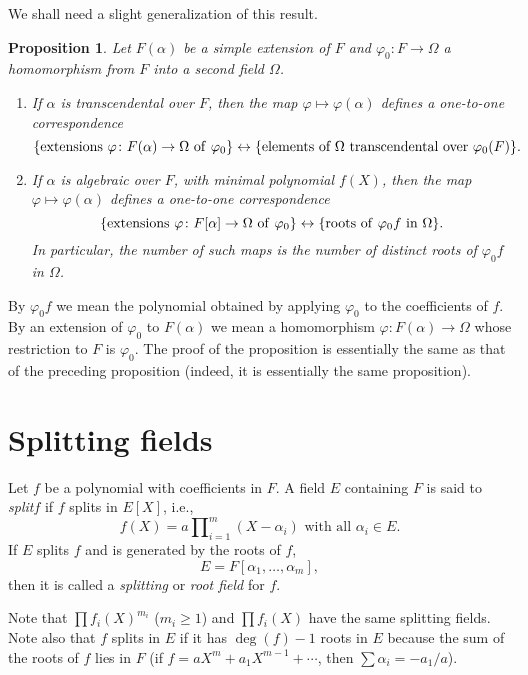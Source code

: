 \documentclass[a4paper,11pt,final,openany]{memoir}
\newtheorem{proposition}[X]{Proposition}
\theoremstyle{nonumberplain}
\begin{document}
We shall need a slight generalization of this result.

\begin{proposition}
\label{sf2} Let $F(\alpha)$ be a simple extension of $F$ and $\varphi
_{0}\colon F\rightarrow\Omega$ a homomorphism from $F$ into a second field
$\Omega$.

\begin{enumerate}
\item If $\alpha$ is transcendental over $F$, then the map $\varphi
\mapsto\varphi(\alpha)$ defines a one-to-one correspondence
\[
\{\text{extensions }\varphi\colon F(\alpha)\rightarrow\Omega\text{\textrm{\ of
}}\varphi_{0}\}\leftrightarrow\{\text{elements of }\Omega
\text{\textrm{\ transcendental over }}\varphi_{0}(F)\}.
\]


\item If $\alpha$ is algebraic over $F$, with minimal polynomial $f(X)$, then
the map $\varphi\mapsto\varphi(\alpha)$ defines a one-to-one correspondence
\[
\{\text{extensions }\varphi\colon F[\alpha]\rightarrow\Omega\text{\textrm{\ of
}}\varphi_{0}\}\leftrightarrow\{\text{\textrm{roots of }}\varphi_{0}f\text{ in
}\Omega\}.
\]
In particular, the number of such maps is the number of distinct roots of
$\varphi_{0}f$ in $\Omega$.
\end{enumerate}
\end{proposition}

By $\varphi_{0}f$ we mean the polynomial obtained by applying $\varphi_{0}$ to
the coefficients of $f$. By an extension of $\varphi_{0}$ to $F(\alpha)$ we
mean a homomorphism $\varphi\colon F(\alpha)\rightarrow\Omega$ whose
restriction to $F$ is $\varphi_{0}$. The proof of the proposition is
essentially the same as that of the preceding proposition (indeed, it is
essentially the same proposition).

\section{Splitting fields}

Let $f$ be a polynomial with coefficients in $F$. A field $E$ containing $F$
is said to
%
\emph{split}$f$ if $f$ splits in $E[X]$, i.e.,
\[
f(X)=a\prod\nolimits_{i=1}^{m}(X-\alpha_{i})\text{ with all }\alpha_{i}\in E.
\]
If $E$ splits $f$ and is generated by the roots of $f$,
\[
E=F[\alpha_{1},\ldots,\alpha_{m}],
\]
then it is called a \emph{splitting} or \emph{root field}%
for $f$.

Note that $\prod f_{i}(X)^{m_{i}}$ ($m_{i}\geq1$) and $\prod f_{i}(X)$ have
the same splitting fields. Note also that $f$ splits in $E$ if it has
$\deg(f)-1$ roots in $E$ because the sum of the roots of $f$ lies in $F$ (if
$f=aX^{m}+a_{1}X^{m-1}+\cdots$, then $\sum\alpha_{i}=-a_{1}/a$).
\end{document}
